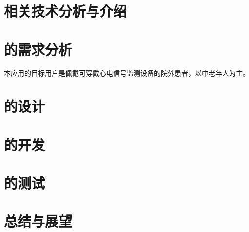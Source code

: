 \documentclass{ecnuthesis}
\begin{document}
    \chapter{相关技术分析与介绍}\label{ch:tech}


    \chapter{\app 的需求分析}\label{ch:requirement}

    本应用的目标用户是佩戴可穿戴心电信号监测设备的院外患者，以中老年人为主。


    \chapter{\app 的设计}\label{ch:design}


    \chapter{\app 的开发}\label{ch:development}


    \chapter{\app 的测试}\label{ch:test}


    \chapter{总结与展望}\label{ch:conclusion}


    \backmatter
    \PrintReference

    \begin{appendix}
        \listoftodos
    \end{appendix}

    \begin{acknowledgement}
    \end{acknowledgement}
\end{document}
